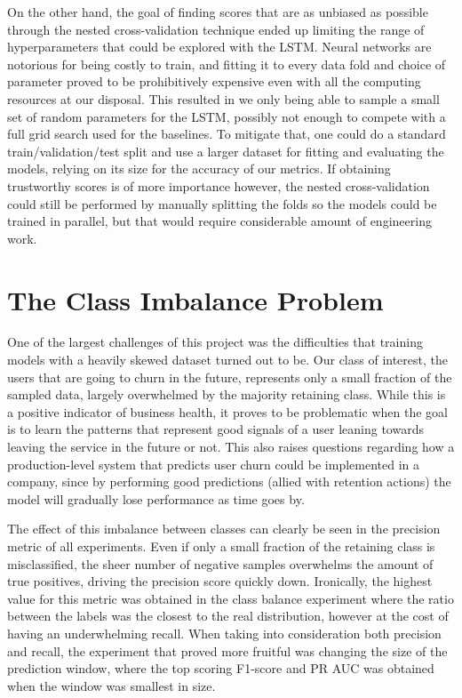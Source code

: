 \documentclass{kththesis}
\begin{document}
On the other hand, the goal of finding scores that are as unbiased as possible through the nested cross-validation technique ended up limiting the range of hyperparameters that could be explored with the LSTM. Neural networks are notorious for being costly to train, and fitting it to every data fold and choice of parameter proved to be prohibitively expensive even with all the computing resources at our disposal. This resulted in we only being able to sample a small set of random parameters for the LSTM, possibly not enough to compete with a full grid search used for the baselines. To mitigate that, one could do a standard train/validation/test split and use a larger dataset for fitting and evaluating the models, relying on its size for the accuracy of our metrics. If obtaining trustworthy scores is of more importance however, the nested cross-validation could still be performed by manually splitting the folds so the models could be trained in parallel, but that would require considerable amount of engineering work.

\section{The Class Imbalance Problem}

One of the largest challenges of this project was the difficulties that training models with a heavily skewed dataset turned out to be. Our class of interest, the users that are going to churn in the future, represents only a small fraction of the sampled data, largely overwhelmed by the majority retaining class. While this is a positive indicator of business health, it proves to be problematic when the goal is to learn the patterns that represent good signals of a user leaning towards leaving the service in the future or not. This also raises questions regarding how a production-level system that predicts user churn could be implemented in a company, since by performing good predictions (allied with retention actions) the model will gradually lose performance as time goes by.

The effect of this imbalance between classes can clearly be seen in the precision metric of all experiments. Even if only a small fraction of the retaining class is misclassified, the sheer number of negative samples overwhelms the amount of true positives, driving the precision score quickly down. Ironically, the highest value for this metric was obtained in the class balance experiment where the ratio between the labels was the closest to the real distribution, however at the cost of having an underwhelming recall. When taking into consideration both precision and recall, the experiment that proved more fruitful was changing the size of the prediction window, where the top scoring F1-score and PR AUC was obtained when the window was smallest in size. 
\end{document}
